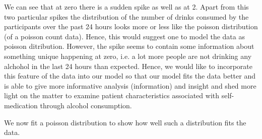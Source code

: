 \documentclass{article}\usepackage[]{graphicx}\usepackage[]{color}
\begin{document}
We can see that at zero there is a sudden spike as well as at 2. Apart from this two particular spikes the distribution of the number of drinks consumed by the participants over the past 24 hours looks more or less like the poisson distribution (of a poisson count data). Hence, this would suggest one to model the data as poisson ditribution. However, the spike seems to contain some information about something unique happening at zero, i.e. a lot more people are not drinking any alchohol in the last 24 hours than expected. Hence, we would like to incorporate this feature of the data into our model so that our model fits the data better and is able to give more informative analysis  (information) and insight and shed more light on the matter to examine patient characteristics associated with self-medication through alcohol consumption.

\vspace{5mm}

We now fit a poisson distribution to show how well such a distribution fits the data. 
\end{document}
